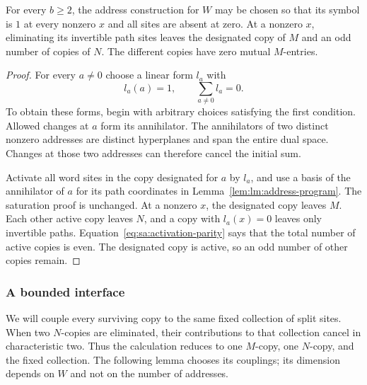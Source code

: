 \begin{lemma}
\label{lem:sa:balanced-copies}
For every $b\ge2$, the address construction for $W$ may be chosen so
that its symbol is $1$ at every nonzero $x$ and all sites are absent
at zero. At a nonzero $x$, eliminating its invertible path sites
leaves the designated copy of $M$ and an odd number of copies of $N$.
The different copies have zero mutual $M$-entries.
\end{lemma}

\begin{proof}
For every $a\ne0$ choose a linear form $l_a$ with
\begin{equation}
 l_a(a)=1,\qquad \sum_{a\ne0}l_a=0.
 \label{eq:sa:activation-parity}
\end{equation}
To obtain these forms, begin with arbitrary choices satisfying the
first condition. Allowed changes at $a$ form its annihilator.
The annihilators of two distinct nonzero addresses are distinct
hyperplanes and span the entire dual space. Changes at those two
addresses can therefore cancel the initial sum.

Activate all word sites in the copy designated for $a$ by $l_a$, and
use a basis of the annihilator of $a$ for its path coordinates in
Lemma~\ref{lem:lm:address-program}. The saturation proof is unchanged.
At a nonzero $x$, the designated copy leaves $M$. Each other active
copy leaves $N$, and a copy with $l_a(x)=0$ leaves only invertible
paths. Equation~\eqref{eq:sa:activation-parity} says that the total
number of active copies is even. The designated copy is active, so
an odd number of other copies remain.
\end{proof}

\subsubsection{A bounded interface}

We will couple every surviving copy to the same fixed collection of
split sites. When two $N$-copies are eliminated, their contributions
to that collection cancel in characteristic two. Thus the calculation
reduces to one $M$-copy, one $N$-copy, and the fixed collection. The
following lemma chooses its couplings; its dimension depends on $W$
and not on the number of addresses.

